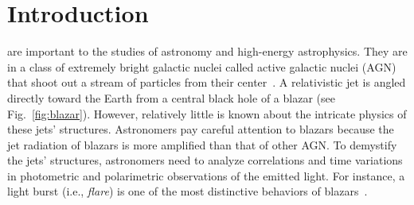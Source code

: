 \ifCLASSOPTIONcompsoc
{}
\else
\section{Introduction}
\label{sec:introduction}
\fi
 are important to the studies of astronomy and high-energy astrophysics. 
They are in a class of extremely bright galactic nuclei called active galactic nuclei (AGN) that shoot out a stream of particles from their center~\cite{Antonucci1993a}. 
A relativistic jet is angled directly toward the Earth from a central black hole of a blazar (see Fig.~\ref{fig:blazar}).
However, relatively little is known about the intricate physics of these jets' structures. %
Astronomers pay careful attention to blazars
because the jet radiation of blazars is more amplified than that of other AGN.
To demystify the jets' structures,
astronomers need to analyze correlations and time variations in photometric and polarimetric observations of the emitted light.
For instance, a light burst (i.e., \textit{flare}) is one of the most distinctive behaviors of blazars~\cite{Bednarek1999, Atoyan2001}.
